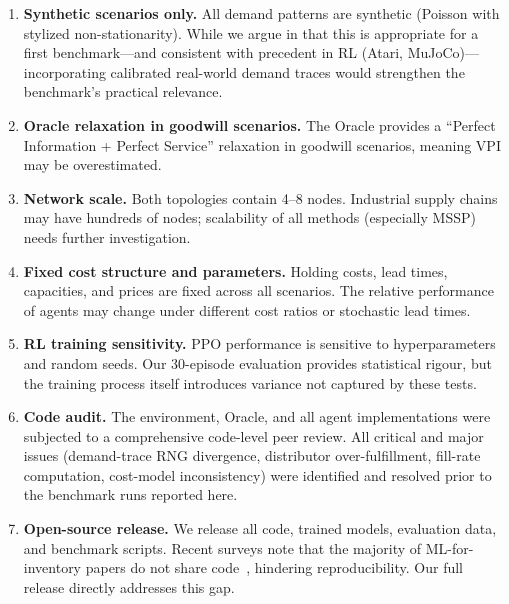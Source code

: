 \documentclass[preprint,12pt]{elsarticle}
\begin{document}
\begin{enumerate}
  \item \textbf{Synthetic scenarios only.} All demand patterns are
        synthetic (Poisson with stylized non-stationarity). While we argue
        in  that this is appropriate for a
        first benchmark---and consistent with precedent in RL
        (Atari, MuJoCo)---incorporating calibrated real-world demand
        traces would strengthen the benchmark's practical relevance.

  \item \textbf{Oracle relaxation in goodwill scenarios.} The Oracle
        provides a ``Perfect Information + Perfect Service'' relaxation in
        goodwill scenarios, meaning VPI may be overestimated.

  \item \textbf{Network scale.} Both topologies contain 4--8 nodes.
        Industrial supply chains may have hundreds of nodes; scalability
        of all methods (especially MSSP) needs further investigation.

  \item \textbf{Fixed cost structure and parameters.} Holding costs,
        lead times, capacities, and prices are fixed across all
        scenarios. The relative performance of agents may change under
        different cost ratios or stochastic lead times.

  \item \textbf{RL training sensitivity.} PPO performance is sensitive to
        hyperparameters and random seeds. Our 30-episode evaluation
        provides statistical rigour, but the training process itself
        introduces variance not captured by these tests.

  \item \textbf{Code audit.} The environment, Oracle, and all agent
        implementations were subjected to a comprehensive code-level
        peer review. All critical and major issues (demand-trace RNG
        divergence, distributor over-fulfillment, fill-rate computation,
        cost-model inconsistency) were identified and resolved prior to
        the benchmark runs reported here.

  \item \textbf{Open-source release.} We release all code, trained models,
        evaluation data, and benchmark scripts. Recent surveys note
        that the majority of ML-for-inventory papers do not share
        code~\citep{bergsma2025systematic}, hindering reproducibility.
        Our full release directly addresses this gap.
\end{enumerate}
\end{document}
